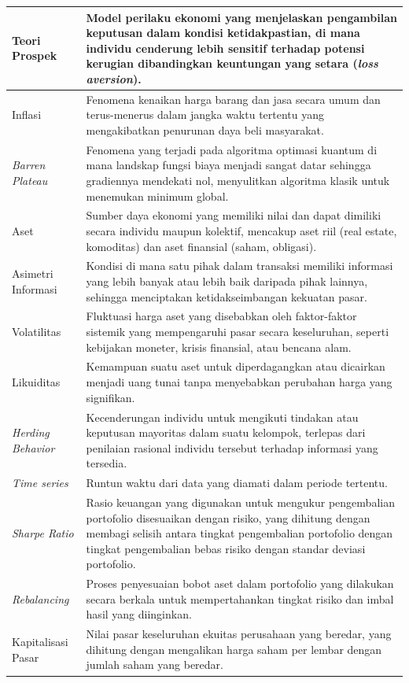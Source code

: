 \begin{longtable}{|p{3.5cm}|p{10.5cm}|}
Teori Prospek & Model perilaku ekonomi yang menjelaskan pengambilan keputusan dalam kondisi ketidakpastian, di mana individu cenderung lebih sensitif terhadap potensi kerugian dibandingkan keuntungan yang setara (\textit{loss aversion}). \\ \hline
Inflasi & Fenomena kenaikan harga barang dan jasa secara umum dan terus-menerus dalam jangka waktu tertentu yang mengakibatkan penurunan daya beli masyarakat. \\ \hline
\textit{Barren Plateau} & Fenomena yang terjadi pada algoritma optimasi kuantum di mana landskap fungsi biaya menjadi sangat datar sehingga gradiennya mendekati nol, menyulitkan algoritma klasik untuk menemukan minimum global. \\ \hline
Aset & Sumber daya ekonomi yang memiliki nilai dan dapat dimiliki secara individu maupun kolektif, mencakup aset riil (real estate, komoditas) dan aset finansial (saham, obligasi). \\ \hline
Asimetri Informasi & Kondisi di mana satu pihak dalam transaksi memiliki informasi yang lebih banyak atau lebih baik daripada pihak lainnya, sehingga menciptakan ketidakseimbangan kekuatan pasar. \\ \hline
Volatilitas & Fluktuasi harga aset yang disebabkan oleh faktor-faktor sistemik yang mempengaruhi pasar secara keseluruhan, seperti kebijakan moneter, krisis finansial, atau bencana alam. \\ \hline
Likuiditas & Kemampuan suatu aset untuk diperdagangkan atau dicairkan menjadi uang tunai tanpa menyebabkan perubahan harga yang signifikan. \\ \hline
\textit{Herding Behavior} & Kecenderungan individu untuk mengikuti tindakan atau keputusan mayoritas dalam suatu kelompok, terlepas dari penilaian rasional individu tersebut terhadap informasi yang tersedia. \\ \hline
\textit{Time series} & Runtun waktu dari data yang diamati dalam periode tertentu. \\ \hline
\textit{Sharpe Ratio} & Rasio keuangan yang digunakan untuk mengukur pengembalian portofolio disesuaikan dengan risiko, yang dihitung dengan membagi selisih antara tingkat pengembalian portofolio dengan tingkat pengembalian bebas risiko dengan standar deviasi portofolio. \\ \hline
\textit{Rebalancing} & Proses penyesuaian bobot aset dalam portofolio yang dilakukan secara berkala untuk mempertahankan tingkat risiko dan imbal hasil yang diinginkan. \\ \hline
Kapitalisasi Pasar & Nilai pasar keseluruhan ekuitas perusahaan yang beredar, yang dihitung dengan mengalikan harga saham per lembar dengan jumlah saham yang beredar. \\ \hline
\end{longtable}
